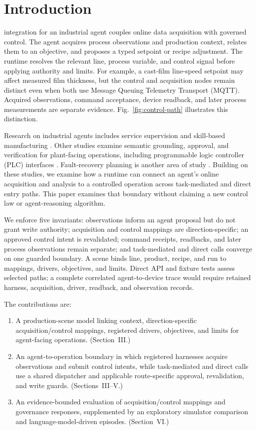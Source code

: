 \section{Introduction}
 integration for an industrial agent couples online data acquisition with governed control. The agent acquires process observations and production context, relates them to an objective, and proposes a typed setpoint or recipe adjustment. The runtime resolves the relevant line, process variable, and control signal before applying authority and limits. For example, a cast-film line-speed setpoint may affect measured film thickness, but the control and acquisition nodes remain distinct even when both use Message Queuing Telemetry Transport (MQTT). Acquired observations, command acceptance, device readback, and later process measurements are separate evidence. Fig.~\ref{fig:control-path} illustrates this distinction.

Research on industrial agents includes service supervision and skill-based manufacturing \cite{biskupovic2025supervision,koehle2026llmdriven}. Other studies examine semantic grounding, approval, and verification for plant-facing operations, including programmable logic controller (PLC) interfaces \cite{graul2026aas,schall2026safe}. Fault-recovery planning is another area of study \cite{vyas2026detection}. Building on these studies, we examine how a runtime can connect an agent's online acquisition and analysis to a controlled operation across task-mediated and direct entry paths. This paper examines that boundary without claiming a new control law or agent-reasoning algorithm.

We enforce five invariants: observations inform an agent proposal but do not grant write authority; acquisition and control mappings are direction-specific; an approved control intent is revalidated; command receipts, readbacks, and later process observations remain separate; and task-mediated and direct calls converge on one guarded boundary. A scene binds line, product, recipe, and run to mappings, drivers, objectives, and limits. Direct API and fixture tests assess selected paths; a complete correlated agent-to-device trace would require retained harness, acquisition, driver, readback, and observation records.

The contributions are:
\begin{enumerate}
  \item A production-scene model linking context, direction-specific acquisition/control mappings, registered drivers, objectives, and limits for agent-facing operations. (Section~III.)
  \item An agent-to-operation boundary in which registered harnesses acquire observations and submit control intents, while task-mediated and direct calls use a shared dispatcher and applicable route-specific approval, revalidation, and write guards. (Sections~III--V.)
  \item An evidence-bounded evaluation of acquisition/control mappings and governance responses, supplemented by an exploratory simulator comparison and language-model-driven episodes. (Section~VI.)
\end{enumerate}

